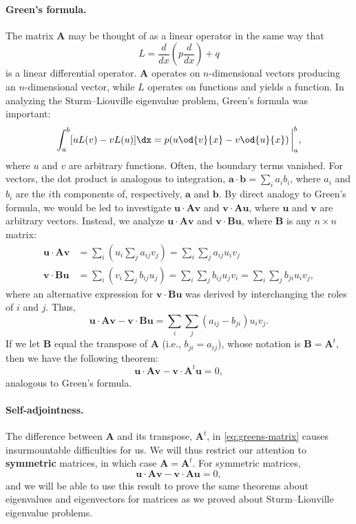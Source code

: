 \paragraph{Green's formula.}
The matrix $\bm{A}$ may be thought of as a linear operator in the same way that
\[
L = \frac{d}{d x}\left(p\frac{d}{d x}\right) + q
\]
is a linear differential operator.  $\bm{A}$ operates on $n$-dimensional vectors producing an $n$-dimensional vector, while $L$ operates on functions and yields a function.  In analyzing the Sturm--Liouville eigenvalue problem, Green's formula was important:
\[
\int_a^b [uL(v) - vL(u)]\dx = p\!\left(u\od{v}{x} - v\od{u}{x}\right)\bigg|_a^b,
\]
where $u$ and $v$ are arbitrary functions.  Often, the boundary terms vanished.  For vectors, the dot product is analogous to integration, $\bm{a}\cdot\bm{b} = \sum_i a_ib_i$, where $a_i$ and $b_i$ are the $i$th components of, respectively, $\bm{a}$ and $\bm{b}$.  By direct analogy to Green's formula, we would be led to investigate $\bm{u}\cdot\bm{A}\bm{v}$ and $\bm{v}\cdot\bm{A}\bm{u}$, where $\bm{u}$ and $\bm{v}$ are arbitrary vectors.  Instead, we analyze $\bm{u}\cdot\bm{A}\bm{v}$ and $\bm{v}\cdot\bm{B}\bm{u}$, where $\bm{B}$ is any $n \times n$ matrix:
\begin{align*}
\bm{u}\cdot\bm{A}\bm{v} &= \textstyle\sum_i(u_i\sum_j a_{ij}v_j) = \sum_i\sum_j a_{ij}u_iv_j \\
\bm{v}\cdot\bm{B}\bm{u} &= \textstyle\sum_i(v_i\sum_j b_{ij}u_j) = \sum_i\sum_j b_{ij}u_jv_i = \sum_i\sum_j b_{ji}u_iv_j,
\end{align*}
where an alternative expression for $\bm{v}\cdot\bm{B}\bm{u}$ was derived by interchanging the roles of $i$ and $j$.  Thus,
\[
\bm{u}\cdot\bm{A}\bm{v} - \bm{v}\cdot\bm{B}\bm{u} = \sum_i\sum_j (a_{ij} - b_{ji})u_iv_j.
\]
If we let $\bm{B}$ equal the transpose of $\bm{A}$ (i.e., $b_{ji} = a_{ij}$), whose notation is $\bm{B} = \bm{A}^t$, then we have the following theorem:
\begin{equation}
\label{eq:greens-matrix}
\boxed{\bm{u}\cdot\bm{A}\bm{v} - \bm{v}\cdot\bm{A}^t\bm{u} = 0,}
\end{equation}
analogous to Green's formula.

\paragraph{Self-adjointness.}
The difference between $\bm{A}$ and its transpose, $\bm{A}^t$, in \eqref{eq:greens-matrix} causes insurmountable difficulties for us.  We will thus restrict our attention to \textbf{symmetric} matrices, in which case $\bm{A} = \bm{A}^t$.  For symmetric matrices,
\begin{equation}
\label{eq:symmetric-green}
\boxed{\bm{u}\cdot\bm{A}\bm{v} - \bm{v}\cdot\bm{A}\bm{u} = 0,}
\end{equation}
and we will be able to use this result to prove the same theorems about eigenvalues and eigenvectors for matrices as we proved about Sturm--Liouville eigenvalue problems.

